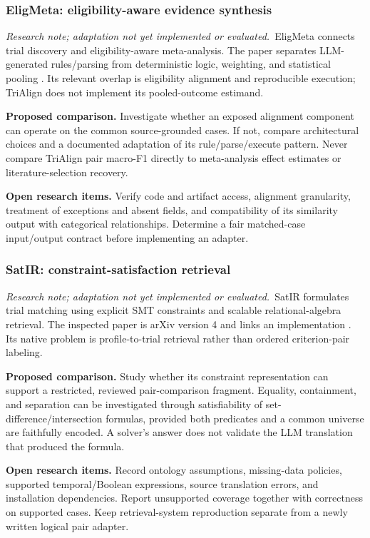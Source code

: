 \documentclass[10pt,letterpaper]{article}
\newcommand{\research}{\textit{Research note; adaptation not yet implemented or evaluated.}}
\begin{document}
\subsubsection{EligMeta: eligibility-aware evidence synthesis}
\research\ EligMeta connects trial discovery and eligibility-aware
meta-analysis. The paper separates LLM-generated rules/parsing from
deterministic logic, weighting, and statistical pooling \cite{eligmeta}.
Its relevant overlap is eligibility alignment and reproducible execution;
TriAlign does not implement its pooled-outcome estimand.

\textbf{Proposed comparison.} Investigate whether an exposed alignment
component can operate on the common source-grounded cases. If not, compare
architectural choices and a documented adaptation of its rule/parse/execute
pattern. Never compare TriAlign pair macro-F1 directly to meta-analysis
effect estimates or literature-selection recovery.

\textbf{Open research items.} Verify code and artifact access, alignment
granularity, treatment of exceptions and absent fields, and compatibility of
its similarity output with categorical relationships. Determine a fair
matched-case input/output contract before implementing an adapter.

\subsubsection{SatIR: constraint-satisfaction retrieval}
\research\ SatIR formulates trial matching using explicit SMT constraints
and scalable relational-algebra retrieval. The inspected paper is arXiv
version 4 and links an implementation \cite{satir,satircode}. Its native
problem is profile-to-trial retrieval rather than ordered criterion-pair
labeling.

\textbf{Proposed comparison.} Study whether its constraint representation
can support a restricted, reviewed pair-comparison fragment. Equality,
containment, and separation can be investigated through satisfiability of
set-difference/intersection formulas, provided both predicates and a common
universe are faithfully encoded. A solver's answer does not validate the
LLM translation that produced the formula.

\textbf{Open research items.} Record ontology assumptions, missing-data
policies, supported temporal/Boolean expressions, source translation
errors, and installation dependencies. Report unsupported coverage together
with correctness on supported cases. Keep retrieval-system reproduction
separate from a newly written logical pair adapter.
\end{document}
